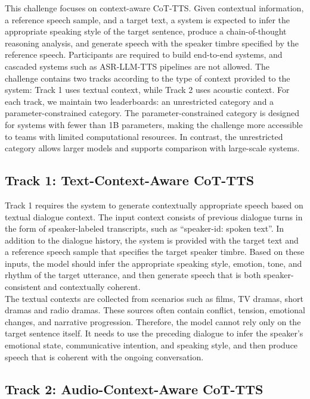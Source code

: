 \documentclass[a4paper]{article}
\begin{document}
This challenge focuses on context-aware CoT-TTS. Given contextual information, a reference speech sample, and a target text, a system is expected to infer the appropriate speaking style of the target sentence, produce a chain-of-thought reasoning analysis, and generate speech with the speaker timbre specified by the reference speech. Participants are required to build end-to-end systems, and cascaded systems such as ASR-LLM-TTS pipelines are not allowed. The challenge contains two tracks according to the type of context provided to the system: Track 1 uses textual context, while Track 2 uses acoustic context. For each track, we maintain two leaderboards: an unrestricted category and a parameter-constrained category. The parameter-constrained category is designed for systems with fewer than 1B parameters, making the challenge more accessible to teams with limited computational resources. In contrast, the unrestricted category allows larger models and supports comparison with large-scale systems.

\subsection{Track 1: Text-Context-Aware CoT-TTS}

Track 1 requires the system to generate contextually appropriate speech based on textual dialogue context. The input context consists of previous dialogue turns in the form of speaker-labeled transcripts, such as ``speaker-id: spoken text''. In addition to the dialogue history, the system is provided with the target text and a reference speech sample that specifies the target speaker timbre. Based on these inputs, the model should infer the appropriate speaking style, emotion, tone, and rhythm of the target utterance, and then generate speech that is both speaker-consistent and contextually coherent.\\

\noindent The textual contexts are collected from scenarios such as films, TV dramas, short dramas and radio dramas. These sources often contain conflict, tension, emotional changes, and narrative progression. Therefore, the model cannot rely only on the target sentence itself. It needs to use the preceding dialogue to infer the speaker's emotional state, communicative intention, and speaking style, and then produce speech that is coherent with the ongoing conversation.


\subsection{Track 2: Audio-Context-Aware CoT-TTS}
\end{document}
